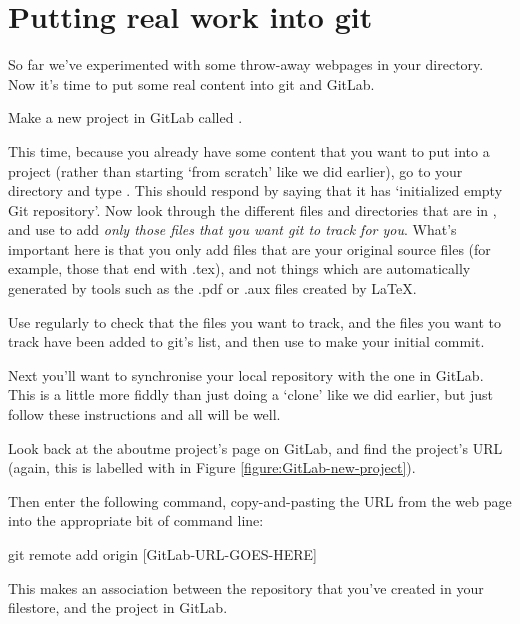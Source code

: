 \section{Putting real work into git}

So far we've experimented with some throw-away webpages in your  directory. Now it's time to put some real content into git and GitLab.


Make a new project in GitLab called . 

This time, because you already have some content that you want to put into a project (rather than starting `from scratch' like we did earlier), go to your  directory and type . This should respond by saying that it has `initialized empty Git repository'. Now look through the different files and directories that are in , and use  to add \emph{only those files that you want git to track for you}. What's important here is that you only add files that are your original source files (for example, those that end with .tex), and not things which are automatically generated by tools such as the .pdf or .aux files created by LaTeX.

Use  regularly to check that the files you want to track, and  the files you want to track have been added to git's list, and then use  to make your initial commit. 

Next you'll want to synchronise your local repository with the one in GitLab. This is a little more fiddly than just doing a `clone' like we did earlier, but just follow these instructions and all will be well.
 
Look back at the aboutme project's page on GitLab, and find the  project's URL (again, this is labelled with \protect{} in Figure \ref{figure:GitLab-new-project}).

Then enter the following command, copy-and-pasting the URL from the web page into the appropriate bit of command line:

\begin{ttoutenv}
git remote add origin [GitLab-URL-GOES-HERE]
\end{ttoutenv}

This makes an association between the repository that you've created in your filestore, and the project in GitLab.

